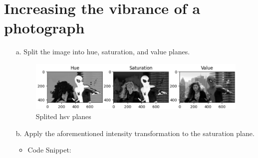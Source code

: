 \documentclass[12pt,a4paper]{article}
\begin{document}
    

\section{Increasing the vibrance of a photograph}

    \begin{enumerate}
        \item[a.] Split the image into hue, saturation, and value planes.

    \begin{figure}[H]
        \centering
        \includegraphics[width=0.85\linewidth]{images/Screenshots/4a.png}
        \caption{Splited hsv planes}
        \label{fig:enter-label}
    \end{figure}
    
    

    
    \item[b.] Apply the aforementioned intensity transformation to the saturation plane.

    \begin{itemize}
        \item Code Snippet:
    \end{itemize}
    
    


\end{enumerate}
\end{document}
